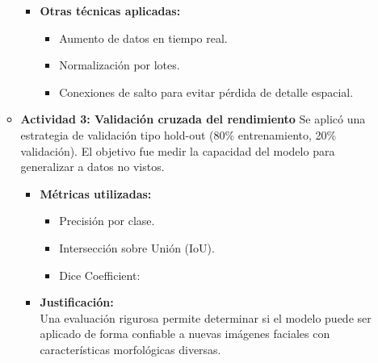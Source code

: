 \begin{enumerate}
\begin{itemize}
\begin{itemize}
  \item \textbf{Otras técnicas aplicadas:}
  \begin{itemize}
    \item Aumento de datos en tiempo real.
    \item Normalización por lotes.
    \item Conexiones de salto para evitar pérdida de detalle espacial.
  \end{itemize}
\end{itemize}

\vspace{0.5cm}


  \item\textbf{Actividad 3: Validación cruzada del rendimiento}
  Se aplicó una estrategia de validación tipo hold-out (80\% entrenamiento, 20\% validación). El objetivo fue medir la capacidad del modelo para generalizar a datos no vistos.

\begin{itemize}
  \item \textbf{Métricas utilizadas:}
  \begin{itemize}
    \item Precisión por clase.
    \item Intersección sobre Unión (IoU).
    \item Dice Coefficient:
  \end{itemize}

  \item \textbf{Justificación:} \\
  Una evaluación rigurosa permite determinar si el modelo puede ser aplicado de forma confiable a nuevas imágenes faciales con características morfológicas diversas.
\end{itemize}



  \end{itemize}


\end{enumerate}
